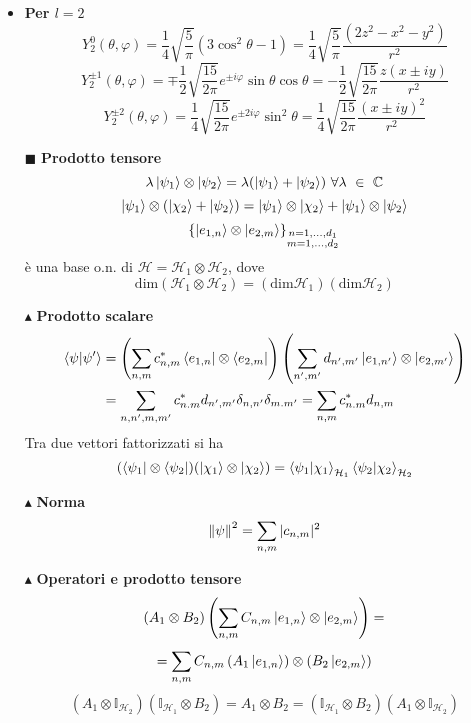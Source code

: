 \documentclass{book}
\newcommand{\g}{\textbf}
\newcommand{\e}{\begin{equation}}
\newcommand{\ex}{\end{equation} }
\renewcommand{\it}{\item[$\cdot$]}
\begin{document}
\begin{multicols}{4}
\begin{itemize}
    \it \g{Per $l = 2$}
        \e{Y^0_2(\theta, \varphi) = \frac{1}{4} \sqrt{\frac{5}{\pi}} (3\cos^2\theta - 1) = \frac{1}{4} \sqrt{\frac{5}{\pi}} \frac{(2z^2 - x^2 - y^2)}{r^2}} \ex
        \e{Y^{\pm 1}_2(\theta, \varphi) = \mp\frac{1}{2} \sqrt{\frac{15}{2\pi}} e^{\pm i\varphi} \sin\theta \cos\theta = -\frac{1}{2} \sqrt{\frac{15}{2\pi}} \frac{z(x \pm iy)}{r^2}} \ex
        \e{Y^{\pm 2}_2(\theta, \varphi) = \frac{1}{4} \sqrt{\frac{15}{2\pi}} e^{\pm 2i\varphi} \sin^2\theta = \frac{1}{4} \sqrt{\frac{15}{2\pi}} \frac{(x \pm iy)^2}{r^2}} \ex
        \item [$\blacksquare$] \g{Prodotto tensore}
        \e{\lambda \ket{\psi_{1}} \otimes \ket{\psi_{2}} = \lambda (\ket{\psi_{1}} + \ket{\psi_{2}}) \ \forall \lambda \ \in\  \mathbb{C}}\ex
\e{\ket{\psi_{1}} \otimes (\ket{\chi_{2}} + \ket{\psi_{2}}) = \ket{\psi_{1}} \otimes \ket{\chi_{2}} + \ket{\psi_{1}} \otimes \ket{\psi_{2}}}\ex
\e{\left\{ \ket{e_{1,n}} \otimes \ket{e_{2,m}} \right\}_{\substack{n = 1,\dots,d_1 \\ m = 1,\dots,d_2}}}\ex
è una base o.n. di $\mathcal{H} = \mathcal{H}_{1} \otimes \mathcal{H}_{2}$, dove
\e{\text{dim}(\mathcal{H}_{1} \otimes \mathcal{H}_{2}) = (\text{dim}\mathcal{H}_{1})(\text{dim}\mathcal{H}_{2})}\ex
    \item [$\blacktriangle$]\g{Prodotto scalare}
\begin{align}
    \braket{\psi}{\psi'} &= \left(\sum_{n,m}c_{n,m}^{*
}\bra{e_{1,n}}\otimes\bra{e_{2,m}}\right)\left(\sum_{n',m'}d_{n',m'}\ket{e_{1,n'}}\otimes\ket{e_{2,m'}}\right) \\
&= \sum_{n,n',m,m'}c_{n.m}^{*}d_{n',m'}\delta_{n,n'}\delta_{m.m'} = \sum_{n,m}c_{n.m}^{*}d_{n,m}
\end{align}
Tra due vettori fattorizzati si ha 
\e{(\bra{\psi_{1}}\otimes \bra{\psi_{2}})(\ket{\chi_{1}}\otimes\ket{\chi_{2}}) = \braket{\psi_{1}}{\chi_{1}}_{\mathcal{H}_{1}}\braket{\psi_{2}}{\chi_{2}}_{\mathcal{H}_{2}}}\ex
     \item [$\blacktriangle$]\g{Norma}
\e{\norm{\psi}^{2} = \sum_{n,m}|c_{n,m}|^{2}}\ex
\item [$\blacktriangle$] \g{Operatori e prodotto tensore}
\e{(A_{1} \otimes B_{2})\left(\sum_{n,m}C_{n,m}\ket{e_{1,n}} \otimes \ket{e_{2,m}}\right) = }\ex
\e{ = \sum_{n,m}C_{n,m}\left(A_{1}\ket{e_{1,n}}\right) \otimes \left(B_{2}\ket{e_{2,m}}\right)}\ex
\e{(A_{1} \otimes \mathbb{I}_{\mathcal{H}_{2}})(\mathbb{I}_{\mathcal{H}_{1}} \otimes B_{2}) = A_{1} \otimes B_{2} = (\mathbb{I}_{\mathcal{H}_{1}} \otimes B_{2})(A_{1} \otimes \mathbb{I}_{\mathcal{H}_{2}})}\ex

\end{itemize}
\end{multicols}
\end{document}
